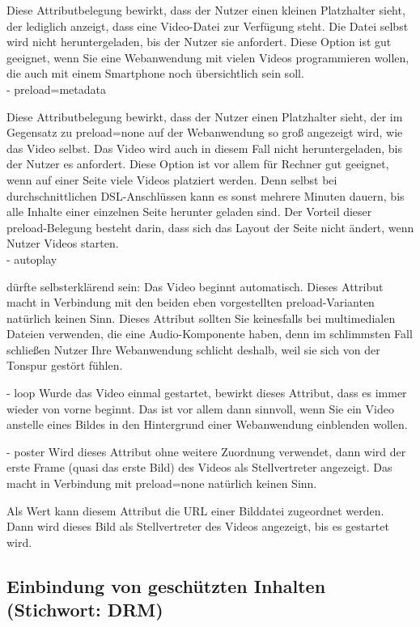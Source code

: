 Diese Attributbelegung bewirkt, dass der Nutzer einen kleinen Platzhalter sieht, der lediglich anzeigt, dass eine Video-Datei zur Verfügung steht. Die Datei selbst wird nicht heruntergeladen, bis der Nutzer sie anfordert. Diese Option ist gut geeignet, wenn Sie eine Webanwendung mit vielen Videos programmieren wollen, die auch mit einem Smartphone noch übersichtlich sein soll.\\

-	preload=metadata

Diese Attributbelegung bewirkt, dass der Nutzer einen Platzhalter sieht, der im Gegensatz zu preload=none auf der Webanwendung so groß angezeigt wird, wie das Video selbst. Das Video wird auch in diesem Fall nicht heruntergeladen, bis der Nutzer es anfordert. Diese Option ist vor allem für Rechner gut geeignet, wenn auf einer Seite viele Videos platziert werden. Denn selbst bei durchschnittlichen DSL-Anschlüssen kann es sonst mehrere Minuten dauern, bis alle Inhalte einer einzelnen Seite herunter geladen sind. Der Vorteil dieser preload-Belegung besteht darin, dass sich das Layout der Seite nicht ändert, wenn Nutzer Videos starten.\\

-	autoplay

dürfte selbsterklärend sein: Das Video beginnt automatisch. Dieses Attribut macht in Verbindung mit den beiden eben vorgestellten preload-Varianten natürlich keinen Sinn. Dieses Attribut sollten Sie keinesfalls bei multimedialen Dateien verwenden, die eine Audio-Komponente haben, denn im schlimmsten Fall schließen Nutzer Ihre Webanwendung schlicht deshalb, weil sie sich von der Tonspur gestört fühlen.

-	loop
Wurde das Video einmal gestartet, bewirkt dieses Attribut, dass es immer wieder von vorne beginnt. Das ist vor allem dann sinnvoll, wenn Sie ein Video anstelle eines Bildes in den Hintergrund einer Webanwendung einblenden wollen. 

-	poster
Wird dieses Attribut ohne weitere Zuordnung verwendet, dann wird der erste Frame (quasi das erste Bild) des Videos als Stellvertreter angezeigt. Das macht in Verbindung mit preload=none natürlich keinen Sinn.

Als Wert kann diesem Attribut die URL einer Bilddatei zugeordnet werden. Dann wird dieses Bild als Stellvertreter des Videos angezeigt, bis es gestartet wird.

\subsection{Einbindung von geschützten Inhalten (Stichwort: DRM)}

